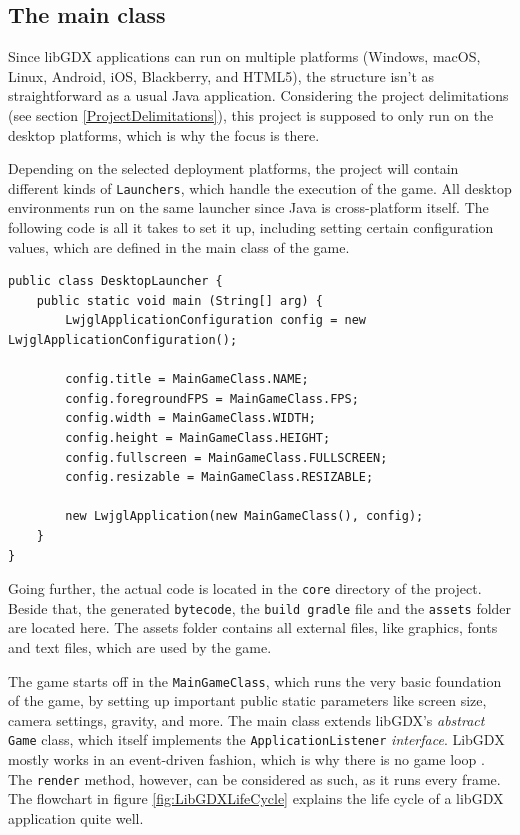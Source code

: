 \documentclass[12p]{article}
\begin{document}

\subsection{The main class} \label{DocMainClass}

Since libGDX applications can run on multiple platforms (Windows, macOS, Linux, Android, iOS, Blackberry, and HTML5), the structure isn't as straightforward as a usual Java application. Considering the project delimitations (see section \ref{ProjectDelimitations}), this project is supposed to only run on the desktop platforms, which is why the focus is there.

Depending on the selected deployment platforms, the project will contain different kinds of \texttt{Launchers}, which handle the execution of the game. All desktop environments run on the same launcher since Java is cross-platform itself. The following code is all it takes to set it up, including setting certain configuration values, which are defined in the main class of the game.

\begin{verbatim}
public class DesktopLauncher {
	public static void main (String[] arg) {
		LwjglApplicationConfiguration config = new LwjglApplicationConfiguration();

		config.title = MainGameClass.NAME;
		config.foregroundFPS = MainGameClass.FPS;
		config.width = MainGameClass.WIDTH;
		config.height = MainGameClass.HEIGHT;
		config.fullscreen = MainGameClass.FULLSCREEN;
		config.resizable = MainGameClass.RESIZABLE;

		new LwjglApplication(new MainGameClass(), config);
	}
}
\end{verbatim}

Going further, the actual code is located in the \texttt{core} directory of the project. Beside that, the generated \texttt{bytecode}, the \texttt{build gradle} file and the \texttt{assets} folder are located here. The assets folder contains all external files, like graphics, fonts and text files, which are used by the game.

The game starts off in the \texttt{MainGameClass}, which runs the very basic foundation of the game, by setting up important public static parameters like screen size, camera settings, gravity, and more. The main class extends libGDX's \emph{abstract} \texttt{Game} class, which itself implements the \texttt{ApplicationListener} \emph{interface}. LibGDX mostly works in an event-driven fashion, which is why there is no game loop \cite{libGDXLifeCycle}. The \texttt{render} method, however, can be considered as such, as it runs every frame. The flowchart in figure \ref{fig:LibGDXLifeCycle} explains the life cycle of a libGDX application quite well.
\end{document}

